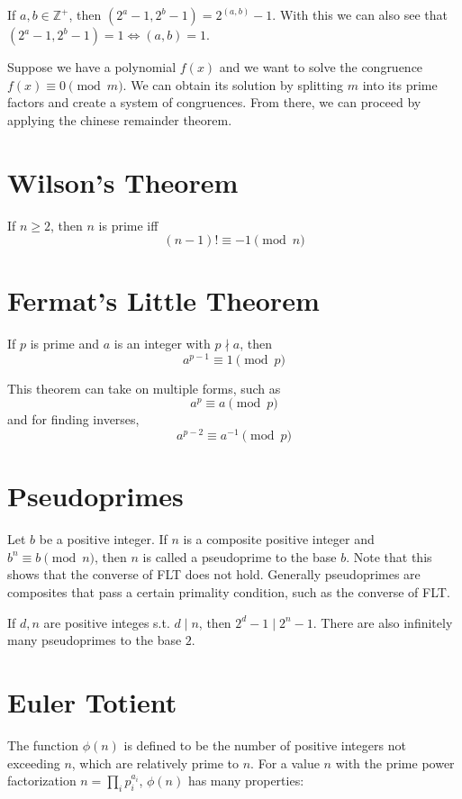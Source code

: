 \documentclass{article}
\begin{document}
\begin{multicols*}{2}
If $a,b \in \mathbb{Z}^+$, then $(2^a - 1, 2^b - 1) = 2^{(a,b)} - 1$. With this we can also see that $(2^a - 1, 2^b - 1) = 1 \Leftrightarrow (a, b) = 1$.

Suppose we have a polynomial $f(x)$ and we want to solve the congruence $f(x) \equiv 0 \pmod{m}$. We can obtain its solution by splitting $m$ into its prime factors and create a system of congruences. From there, we can proceed by applying the chinese remainder theorem.

\section{Wilson's Theorem}

If $n \geq 2$, then $n$ is prime iff \[(n - 1)! \equiv -1 \pmod{n}\]

\section{Fermat's Little Theorem}

If $p$ is prime and $a$ is an integer with $p \nmid a$, then \[a^{p-1} \equiv 1 \pmod{p}\]

This theorem can take on multiple forms, such as \[a^{p} \equiv a \pmod{p}\] and for finding inverses, \[a^{p -2} \equiv a^{-1} \pmod{p}\]

\section{Pseudoprimes}

Let $b$ be a positive integer. If $n$ is a composite positive integer and $b^n \equiv b \pmod{n}$, then $n$ is called a pseudoprime to the base $b$. Note that this shows that the converse of FLT does not hold. Generally pseudoprimes are composites that pass a certain primality condition, such as the converse of FLT.

If $d, n$ are positive integes s.t. $d \mid n$, then $2^d - 1 \mid 2^n - 1$. There are also infinitely many pseudoprimes to the base $2$.

\section{Euler Totient}

The function $\phi(n)$ is defined to be the number of positive integers not exceeding $n$, which are relatively prime to $n$. For a value $n$ with the prime power factorization $n = \prod_{i}p_i^{a_i}$, $\phi(n)$ has many properties:


\end{multicols*}
\end{document}
